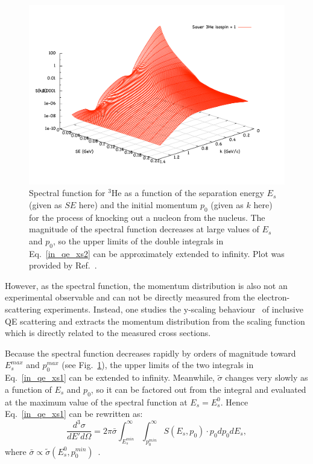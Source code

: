 \begin{figure}[!ht]
  \begin{center}
    \includegraphics[type=pdf,ext=.pdf,read=.pdf,width=0.70\linewidth]{./figures/physics/3HeSKETeq1}
    \caption[Spectral function for $\mathrm{^{3}He}$]{\footnotesize{Spectral function for $\mathrm{^{3}He}$ as a function of the separation energy $E_{s}$ (given as $SE$ here) and the initial momentum $p_{0}$ (given as $k$ here) for the process of knocking out a nucleon from the nucleus. The magnitude of the spectral function decreases at large values of $E_{s}$ and $p_{0}$, so the upper limits of the double integrals in Eq.~\eqref{in_qe_xs2} can be approximately extended to infinity. Plot was provided by Ref.~\cite{donal_prvt}.}}
    \label{pkem}
  \end{center}
\end{figure}
 However, as the spectral function, the momentum distribution is also not an experimental observable and can not be directly measured from the electron-scattering experiments. Instead, one studies the y-scaling behaviour~\cite{West1975263,day_arns, PhysRevC.41.R2474, Boffi19931} of inclusive QE scattering and extracts the momentum distribution from the scaling function which is directly related to the measured cross sections.

 Because the spectral function decreases rapidly by orders of magnitude toward $E_{s}^{max}$ and $p_{0}^{max}$ (see Fig.~\ref{pkem}), the upper limits of the two integrals in Eq.~\eqref{in_qe_xs1} can be extended to infinity. Meanwhile, $\tilde{\sigma}$ changes very slowly as a function of $E_{s}$ and $p_{0}$, so it can be factored out from the integral and evaluated at the maximum value of the spectral function at $E_{s}=E_{s}^{0}$. Hence Eq.~\eqref{in_qe_xs1} can be rewritten as:
\begin{equation}
  \frac{d^{3}\sigma}{dE'd\Omega} = 2\pi \bar{\sigma}\int_{E_{s}^{min}}^{\infty} \int_{p_{0}^{min}}^{\infty}S(E_{s},p_{0})\cdot p_{0}dp_{0}dE_{s},
  \label{in_qe_xs2}
\end{equation}
where $\bar{\sigma} \propto \tilde{\sigma}(E_{s}^{0},p_{0}^{min})$~\cite{PhysRevB.36.1208}. 

